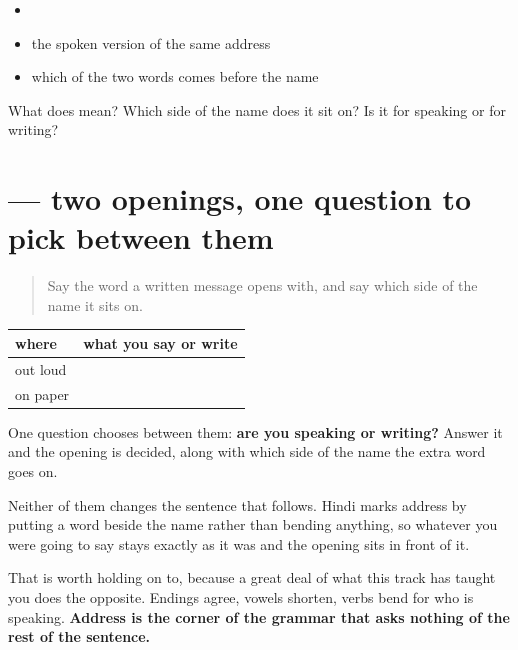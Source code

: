 \begin{itemize}
\raggedright
  \item {} 
  \item the spoken version of the same address
  \item which of the two words comes before the name
\end{itemize}

\begin{tcolorbox}[breakable,colback=teal!4,colframe=teal!35!black,title={Before you move on}]
What does \textbf{} mean? Which side of the name does it sit on? Is it for speaking or for writing?
\end{tcolorbox}
\section[\texorpdfstring{\hi{संबोधन} (sambodhan)}{संबोधन (sambodhan)}]{ — two openings, one question to pick between them}

\label{lesson:HI-C97-repaso-sambodhan}



\begin{quote}
Say the word a written message opens with, and say which side of the name it sits on.
\end{quote}

\begin{grammarlens}[title={Grammar Lens: the two side by side}]
\noindent
\begin{tabularx}{\linewidth}{@{}>{\raggedright\arraybackslash}X>{\raggedright\arraybackslash}X@{}}
\toprule
\textbf{where} & \textbf{what you say or write} \\
\midrule
out loud & \hi{मीरा} \hi{जी} \\
on paper & \hi{प्रिय} \hi{मीरा} \\
\bottomrule
\end{tabularx}

One question chooses between them: \textbf{are you speaking or writing?} Answer it and the opening is decided, along with which side of the name the extra word goes on.
\end{grammarlens}

\begin{grammarlens}[title={Grammar Lens: what the two have in common}]
Neither of them changes the sentence that follows. Hindi marks address by putting a word beside the name rather than bending anything, so whatever you were going to say stays exactly as it was and the opening sits in front of it.

That is worth holding on to, because a great deal of what this track has taught you does the opposite. Endings agree, vowels shorten, verbs bend for who is speaking. \textbf{Address is the corner of the grammar that asks nothing of the rest of the sentence.}
\end{grammarlens}

